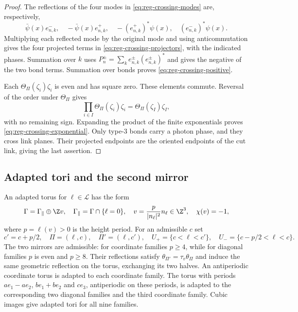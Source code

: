 \begin{proof}
The reflections of the four modes in \eqref{eq:reg-crossing-modes}
are, respectively,
\[
 \bar\psi(x)e_{n,k}^-,\quad-\bar\psi(x)e_{n,k}^+,
 \quad-(e_{n,k}^+)^*\psi(x),\quad(e_{n,k}^-)^*\psi(x).
\]
Multiplying each reflected mode by the original mode and using
anticommutation gives the four projected terms in
\eqref{eq:reg-crossing-projectors}, with the indicated phases.
Summation over $k$ uses
$P_n^\pm=\sum_ke_{n,k}^\pm(e_{n,k}^\pm)^*$ and gives the negative of
the two bond terms. Summation over bonds proves
\eqref{eq:reg-crossing-positive}.

Each $\Theta_\Pi(\zeta_i)\zeta_i$ is even and has square zero.
These elements commute. Reversal of the order under $\Theta_\Pi$
gives
\[
 \prod_{i\in I}\Theta_\Pi(\zeta_i)\zeta_i
 =\Theta_\Pi(\zeta_I)\zeta_I,
\]
with no remaining sign. Expanding the product of the finite
exponentials proves \eqref{eq:reg-crossing-exponential}.
Only type-$3$ bonds carry a photon phase, and they cross link
planes. Their projected endpoints are the oriented endpoints of
the cut link, giving the last assertion.
\end{proof}

\subsection{Adapted tori and the second mirror}\label{subsec:reg-adapted}

An adapted torus for $\ell\in\mathcal L$ has the form
\begin{equation}\label{eq:reg-adapted-torus}
 \Gamma=\Gamma_\parallel\oplus\Z v,
 \quad \Gamma_\parallel=\Gamma\cap\{\ell=0\},
 \quad v=\frac{p}{|n_\ell|^2}n_\ell\in\Z^3,
 \quad \chi(v)=-1,
\end{equation}
where $p=\ell(v)>0$ is the height period. For an admissible $c$ set
\[
 c'=c+p/2,\quad \Pi=(\ell,c),\quad\Pi'=(\ell,c'),\quad
 U_+=\{c<\ell<c'\},\quad U_-=\{c-p/2<\ell<c\}.
\]
The two mirrors are admissible: for coordinate families $p\ge4$,
while for diagonal families $p$ is even and $p\ge8$. Their
reflections satisfy $\theta_{\Pi'}=\tau_v\theta_\Pi$ and induce the
same geometric reflection on the torus, exchanging its two halves.
An antiperiodic coordinate torus is adapted to each coordinate
family. The torus with periods $ae_1-ae_2$, $be_1+be_2$ and $ce_3$,
antiperiodic on these periods, is adapted to the corresponding two
diagonal families and the third coordinate family. Cubic images
give adapted tori for all nine families.

